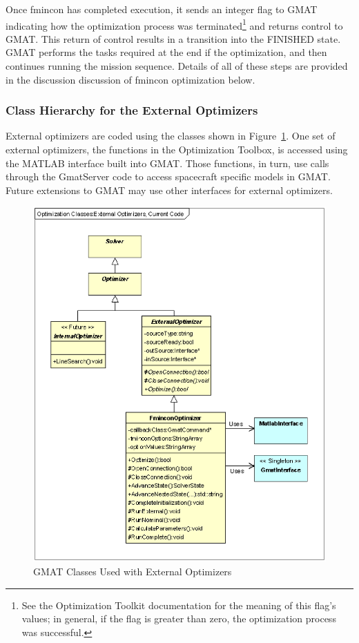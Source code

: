 Once fmincon has completed execution, it sends an integer flag to GMAT indicating how the
optimization process was terminated\footnote{See the Optimization Toolkit documentation for the
meaning of this flag's values; in general, if the flag is greater than zero, the optimization
process was successful.} and returns control to GMAT.  This return of control results in a
transition into the FINISHED state.  GMAT performs the tasks required at the end if the
optimization, and then continues running the mission sequence.  Details of all of these steps are
provided in the discussion discussion of fmincon optimization below.

\subsubsection{Class Hierarchy for the External Optimizers}

External optimizers are coded using the classes shown in
Figure~\ref{figure:OptimizationClassesExternalOptimizers}.  One set of external optimizers, the
functions in the Optimization Toolbox, is accessed using the MATLAB interface built into GMAT.
Those functions, in turn, use calls through the GmatServer code to access spacecraft specific models
in GMAT.  Future extensions to GMAT may use other interfaces for external optimizers.

\begin{figure}[htb]
\begin{center}
\includegraphics[scale=0.5]
{Images/OptimizationClassesExternalOptimizersCurrentCode.eps}
\caption{\label{figure:OptimizationClassesExternalOptimizers}GMAT Classes Used with External
Optimizers}
\end{center}
\end{figure}

